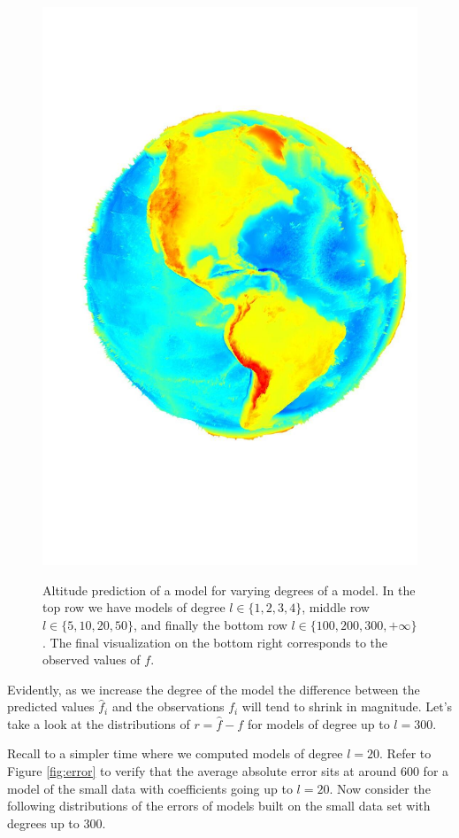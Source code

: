 \documentclass[a4paper]{article}
\theoremstyle{definition}
\begin{document}
\begin{figure}[h!]
\begin{minipage}{.245\textwidth}
        \includegraphics[width=0.95\linewidth]{media/med.jpg}
        \label{fig:med}
    \end{minipage}
    \caption{Altitude prediction of a model for varying degrees of a model. In the top row we have models of degree $l \in \{1, 2, 3, 4\}$, middle row $l \in \{5, 10, 20, 50\}$, and finally the bottom
    row $l \in \{100, 200, 300, +\infty\}$. The final visualization on the bottom right corresponds to the observed values of $f$.}
    \label{fig:earth_models}
\end{figure}

Evidently, as we increase the degree of the model the difference between the predicted values $\hat f_i$ and the observations $f_i$ will tend to 
shrink in magnitude. Let's take a look at the distributions of $r = \hat f - f$ for models of degree up to $l = 300$.

Recall to a simpler time where we computed models of degree $l = 20$. Refer to Figure \ref{fig:error} to verify that the average absolute error sits at around 
600 for a model of the small data with coefficients going up to $l = 20$. Now consider the following distributions of the errors of models built on the small data set
with degrees up to 300.
\end{document}
